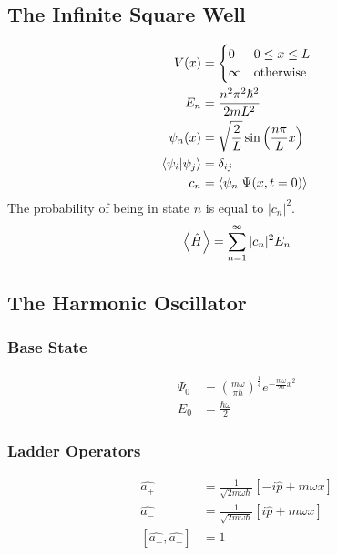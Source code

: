 \documentclass[8pt]{amsart}
\newcommand{\h}{\hat{H}}
\begin{document}
\begin{multicols}{3}
\subsection{The Infinite Square Well}%
\label{sub:the_infinite_square_well}
\begin{align*}
  V(x)&=\begin{cases}
    0 & 0\leq x\leq L\\
    \infty & \text{otherwise}
  \end{cases}\\
  E_n&=\frac{n^2\pi^2\hbar^2}{2mL^2}\\
  \psi_n(x)&=\sqrt{\frac{2}{L}}\sin\left(\frac{n\pi}{L}x\right)\\
  \braket{\psi_i}{\psi_j}&=\delta_{ij}\\
  c_n&=\braket{\psi_n}{\Psi(x,t=0)}
\end{align*}
The probability of being in state $n$ is equal to $|c_n|^2$.
\begin{align*}
  \expval{\h}=\sum_{n=1}^\infty |c_n|^2E_n
\end{align*}

\subsection{The Harmonic Oscillator}%
\label{sub:the_harmonic_oscillator}

\subsubsection{Base State}%
\label{ssub:base_state}

\begin{align*}
  \Psi_0&={\left(\frac{m\omega}{\pi\hbar}\right)}^{\frac{1}{4}}e^{-\frac{m\omega}{2\hbar}x^2}\\
  E_0&=\frac{\hbar\omega}{2}
\end{align*}

\subsubsection{Ladder Operators}%
\label{ssub:ladder_operators}

\begin{align*}
  \hat{a_{+}}&=\frac{1}{\sqrt{2m\omega\hbar}}\left[-i\hat{p}+m\omega x\right]\\
  \hat{a_{-}}&=\frac{1}{\sqrt{2m\omega\hbar}}\left[i\hat{p}+m\omega x\right]\\
  \left[\hat{a_{-}},\hat{a_{+}}\right]&=1\\
\end{align*}


\end{multicols}
\end{document}
